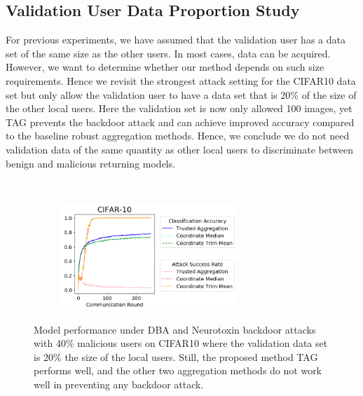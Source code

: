 \documentclass{article} %
\begin{document}
\begin{figure}[htp]
\centering
\end{figure}




%
\subsection{Validation User Data Proportion Study}

For previous experiments, we have assumed that the validation user has a data set of the same size as the other users. In most cases, data can be acquired. However, we want to determine whether our method depends on such size requirements. Hence we revisit the strongest attack setting for the CIFAR10 data set but only allow the validation user to have a data set that is 20\% of the size of the other local users. Here the validation set is now only allowed 100 images, yet TAG prevents the backdoor attack and can achieve improved accuracy compared to the baseline robust aggregation methods. Hence, we conclude we do not need validation data of the same quantity as other local users to discriminate between benign and malicious returning models.

\begin{figure}[htp]
\centering
  \begin{subfigure}{.35\textwidth}
  \centering
  \end{subfigure}%
  ~
  \begin{subfigure}{.65\textwidth}
  \centering
    \includegraphics[height=4cm, left]{make_article/make_visuals/visuals/accuracy--cifar_10--n_malicious4--dba1--beta0.2--neuro_p0.1--n_val_data100.png}
  \end{subfigure}%
\caption{\footnotesize Model performance under DBA and Neurotoxin backdoor attacks with 40\% malicious users on CIFAR10 where the validation data set is 20\% the size of the local users. Still, the proposed method TAG performs well, and the other two aggregation methods do not work well in preventing any backdoor attack.}
\label{fig: accuracy--n_malicious4--n_val_data100}
\end{figure}
\end{document}
